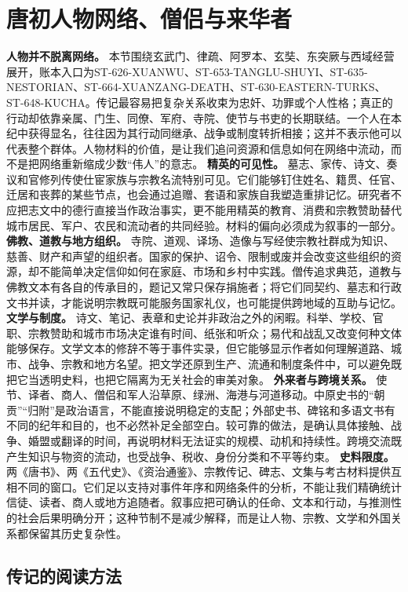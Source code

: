 \section{唐初人物网络、僧侣与来华者} \label{sec:early-tang-biographies-foreigners}  \noindent\textbf{人物并不脱离网络。} 本节围绕玄武门、律疏、阿罗本、玄奘、东突厥与西域经营展开，账本入口为ST-626-XUANWU、ST-653-TANGLU-SHUYI、ST-635-NESTORIAN、ST-664-XUANZANG-DEATH、ST-630-EASTERN-TURKS、ST-648-KUCHA。传记最容易把复杂关系收束为忠奸、功罪或个人性格；真正的行动却依靠亲属、门生、同僚、军府、寺院、使节与书吏的长期联结。一个人在本纪中获得显名，往往因为其行动同继承、战争或制度转折相接；这并不表示他可以代表整个群体。人物材料的价值，是让我们追问资源和信息如何在网络中流动，而不是把网络重新缩成少数“伟人”的意志。  \noindent\textbf{精英的可见性。} 墓志、家传、诗文、奏议和官修列传使仕宦家族与宗教名流特别可见。它们能够钉住姓名、籍贯、任官、迁居和丧葬的某些节点，也会通过追赠、套语和家族自我塑造重排记忆。研究者不应把志文中的德行直接当作政治事实，更不能用精英的教育、消费和宗教赞助替代城市居民、军户、农民和流动者的共同经验。材料的偏向必须成为叙事的一部分。  \noindent\textbf{佛教、道教与地方组织。} 寺院、道观、译场、造像与写经使宗教社群成为知识、慈善、财产和声望的组织者。国家的保护、诏令、限制或废并会改变这些组织的资源，却不能简单决定信仰如何在家庭、市场和乡村中实践。僧传追求典范，道教与佛教文本有各自的传承目的，题记又常只保存捐施者；将它们同契约、墓志和行政文书并读，才能说明宗教既可能服务国家礼仪，也可能提供跨地域的互助与记忆。  \noindent\textbf{文学与制度。} 诗文、笔记、表章和史论并非政治之外的闲暇。科举、学校、官职、宗教赞助和城市市场决定谁有时间、纸张和听众；易代和战乱又改变何种文体能够保存。文学文本的修辞不等于事件实录，但它能够显示作者如何理解道路、城市、战争、宗教和地方名望。把文学还原到生产、流通和制度条件中，可以避免既把它当透明史料，也把它隔离为无关社会的审美对象。  \noindent\textbf{外来者与跨境关系。} 使节、译者、商人、僧侣和军人沿草原、绿洲、海港与河道移动。中原史书的“朝贡”“归附”是政治语言，不能直接说明稳定的支配；外部史书、碑铭和多语文书有不同的纪年和目的，也不必然补足全部空白。较可靠的做法，是确认具体接触、战争、婚盟或翻译的时间，再说明材料无法证实的规模、动机和持续性。跨境交流既产生知识与物资的流动，也受战争、税收、身份分类和不平等约束。  \noindent\textbf{史料限度。} 两《唐书》、两《五代史》、《资治通鉴》、宗教传记、碑志、文集与考古材料提供互相不同的窗口。它们足以支持对事件年序和网络条件的分析，不能让我们精确统计信徒、读者、商人或地方追随者。叙事应把可确认的任命、文本和行动，与推测性的社会后果明确分开；这种节制不是减少解释，而是让人物、宗教、文学和外国关系都保留其历史复杂性。  \subsection{传记的阅读方法} 